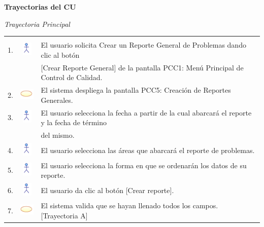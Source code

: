 \documentclass[10pt,spanish]{article}
\providecommand{\tabularnewline}{\\}
\begin{document}
	\newpage
	\textbf{\large Trayectorias del CU\\}{\large \par}
	\textit{\large Trayectoria Principal}{\large{} }{\large \par}
	\begin{tabular}{ccl}
	 &  & \tabularnewline
	1. & \includegraphics{actor} & El usuario solicita Crear un Reporte General de Problemas dando clic al botón   \tabularnewline
	& &  [Crear Reporte General] de la pantalla PCC1: Menú Principal de Control de Calidad.\tabularnewline

	2. & \includegraphics{sistema} &  El sistema despliega la pantalla PCC5: Creación de Reportes Generales.\tabularnewline
	
	3. & \includegraphics{actor} & El usuario selecciona la fecha a partir de la cual abarcará el reporte y la fecha de término \tabularnewline
	&  & del mismo.\tabularnewline
	
	4. & \includegraphics{actor} & El usuario selecciona las áreas que abarcará el reporte de problemas.\tabularnewline 

	5. & \includegraphics{actor} & El usuario selecciona la forma en que se ordenarán los datos de su reporte.  \tabularnewline
	
	6. & \includegraphics{actor} & El usuario da clic al botón [Crear reporte]. \tabularnewline	
	
	7. & \includegraphics{sistema} & El sistema valida que se hayan llenado todos los campos. [Trayectoria A] \tabularnewline
	

\end{tabular}
\end{document}
